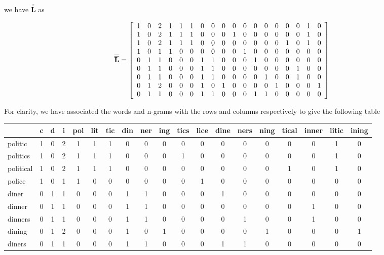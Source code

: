 \documentclass{article}[12pt]
\newcommand{\mat}[1]{\overline{\overline{\mathbf{#1}}}}
\begin{document}
\begin{flushleft}
we have $\mat{L}$ as

\begin{align}
\mat{L} = \left[ 
	\begin{array}{c c c c c c c c c c c c c c c c c c}
		1 & 0 & 2 & 1 & 1 & 1 & 0 & 0 & 0 & 0 & 0 & 0 & 0 & 0 & 0 & 0 & 1 & 0 \\
		1 & 0 & 2 & 1 & 1 & 1 & 0 & 0 & 0 & 1 & 0 & 0 & 0 & 0 & 0 & 0 & 1 & 0 \\
		1 & 0 & 2 & 1 & 1 & 1 & 0 & 0 & 0 & 0 & 0 & 0 & 0 & 0 & 1 & 0 & 1 & 0 \\
		1 & 0 & 1 & 1 & 0 & 0 & 0 & 0 & 0 & 0 & 1 & 0 & 0 & 0 & 0 & 0 & 0 & 0 \\
		0 & 1 & 1 & 0 & 0 & 0 & 1 & 1 & 0 & 0 & 0 & 1 & 0 & 0 & 0 & 0 & 0 & 0 \\
		0 & 1 & 1 & 0 & 0 & 0 & 1 & 1 & 0 & 0 & 0 & 0 & 0 & 0 & 0 & 1 & 0 & 0 \\
		0 & 1 & 1 & 0 & 0 & 0 & 1 & 1 & 0 & 0 & 0 & 0 & 1 & 0 & 0 & 1 & 0 & 0 \\
		0 & 1 & 2 & 0 & 0 & 0 & 1 & 0 & 1 & 0 & 0 & 0 & 0 & 1 & 0 & 0 & 0 & 1 \\
		0 & 1 & 1 & 0 & 0 & 0 & 1 & 1 & 0 & 0 & 0 & 1 & 1 & 0 & 0 & 0 & 0 & 0
	\end{array} \right]
\end{align}

For clarity, we have associated the words and n-grams with the rows and columns respectively to give the following table

\end{flushleft} \begin{center}
\begin{tabular}{l || c c c c c c c c c c c c c c c c c c}
	 & c & d & i & pol & lit & tic & din & ner & ing & tics & lice & dine & ners & ning & tical & inner & litic & ining \\
	\hline
	politic & 1 & 0 & 2 & 1 & 1 & 1 & 0 & 0 & 0 & 0 & 0 & 0 & 0 & 0 & 0 & 0 & 1 & 0 \\
	politics & 1 & 0 & 2 & 1 & 1 & 1 & 0 & 0 & 0 & 1 & 0 & 0 & 0 & 0 & 0 & 0 & 1 & 0 \\
	political & 1 & 0 & 2 & 1 & 1 & 1 & 0 & 0 & 0 & 0 & 0 & 0 & 0 & 0 & 1 & 0 & 1 & 0 \\
	police & 1 & 0 & 1 & 1 & 0 & 0 & 0 & 0 & 0 & 0 & 1 & 0 & 0 & 0 & 0 & 0 & 0 & 0 \\
	diner & 0 & 1 & 1 & 0 & 0 & 0 & 1 & 1 & 0 & 0 & 0 & 1 & 0 & 0 & 0 & 0 & 0 & 0 \\
	dinner & 0 & 1 & 1 & 0 & 0 & 0 & 1 & 1 & 0 & 0 & 0 & 0 & 0 & 0 & 0 & 1 & 0 & 0 \\
	dinners & 0 & 1 & 1 & 0 & 0 & 0 & 1 & 1 & 0 & 0 & 0 & 0 & 1 & 0 & 0 & 1 & 0 & 0 \\
	dining & 0 & 1 & 2 & 0 & 0 & 0 & 1 & 0 & 1 & 0 & 0 & 0 & 0 & 1 & 0 & 0 & 0 & 1 \\
	diners & 0 & 1 & 1 & 0 & 0 & 0 & 1 & 1 & 0 & 0 & 0 & 1 & 1 & 0 & 0 & 0 & 0 & 0
\end{tabular}
\end{center} \begin{flushleft}



\end{flushleft}
\end{document}

